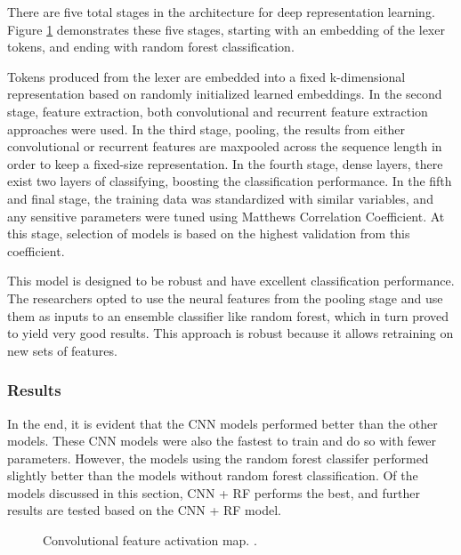 \documentclass[12pt,twocolumn,letterpaper]{article}
\begin{document}
There are five total stages in the architecture for deep representation learning. Figure \ref{fig:af-3} demonstrates these
five stages, starting with an embedding of the lexer tokens, and ending with random forest classification.

Tokens produced from the lexer are embedded into a fixed k-dimensional representation based on randomly initialized learned embeddings.
In the second stage, feature extraction, both convolutional and recurrent feature extraction approaches were used.
In the third stage, pooling, the results from either convolutional or recurrent features are maxpooled across the sequence length in order to
keep a fixed-size representation.
In the fourth stage, dense layers, there exist two layers of classifying, boosting the classification performance.
In the fifth and final stage, the training data was standardized with similar variables, and any sensitive parameters were tuned using Matthews Correlation Coefficient.
At this stage, selection of models is based on the highest validation from this coefficient.

This model is designed to be robust and have excellent classification performance. The researchers opted to use the
neural features from the pooling stage and use them as inputs to an ensemble classifier like random forest, which in turn
proved to yield very good results. This approach is robust because it allows retraining on new sets of features.

\subsubsection{Results}
In the end, it is evident that the CNN models performed better than the other models. These CNN models were also the fastest to train
and do so with fewer parameters. However, the models using the random forest classifer performed slightly better than the models without random forest classification.
Of the models discussed in this section, CNN + RF performs the best, and further results are tested based on the CNN + RF model.

\begin{figure}[h]
    \centering
    \caption{Convolutional feature activation map. \cite{Russell18}.}
    \label{fig:af-3}
\end{figure}
\end{document}
